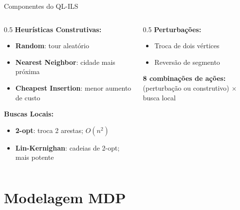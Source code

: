 \documentclass[11pt, xcolor=dvipsnames]{beamer}
\newcommand{\destaque}[1]{\textbf{\textcolor{verde}{#1}}}
\begin{document}
\begin{frame}{Componentes do QL-ILS}
  \footnotesize
  \begin{columns}[T]
    \begin{column}{0.5\textwidth}
      \textbf{Heurísticas Construtivas:}
      \begin{itemize}
        \item \destaque{Random}: tour aleatório
        \item \destaque{Nearest Neighbor}: cidade mais próxima
        \item \destaque{Cheapest Insertion}: menor aumento de custo
      \end{itemize}
      \vspace{3mm}
      \textbf{Buscas Locais:}
      \begin{itemize}
        \item \destaque{2-opt}: troca 2 arestas; $O(n^2)$
        \item \destaque{Lin-Kernighan}: cadeias de 2-opt; mais potente
      \end{itemize}
    \end{column}
    \begin{column}{0.5\textwidth}
      \textbf{Perturbações:}
      \begin{itemize}
        \item Troca de dois vértices
        \item Reversão de segmento
      \end{itemize}
      \vspace{3mm}
      \begin{alertbox}
        {\scriptsize
        \textbf{8 combinações de ações:} \\
        (perturbação ou construtivo) $\times$ busca local
        }
      \end{alertbox}
    \end{column}
  \end{columns}
\end{frame}

\section{Modelagem MDP}
\end{document}
